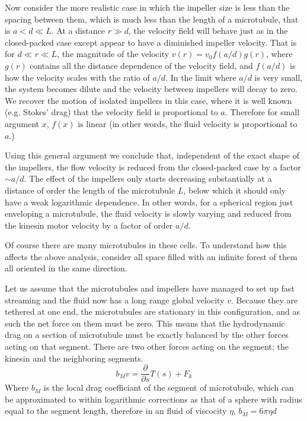 \documentclass[11pt]{ucthesis}
\begin{document}
Now consider the more realistic case in which the impeller size is less than
the spacing between them, which is much less than the length of a
microtubule, that is $a < d \ll L$.  At a distance $r \gg d$, the
velocity field will behave just as in the closed-packed case except appear
to have a diminished impeller velocity. That is for $d \ll r \ll L$,
the magnitude of the velocity $v(r)  = v_0 f(a/d) g(r)$, where $g(r)$
contains all the distance dependence of the velocity field, and $f(a/d)$
is how the velocity scales with the ratio of $a/d$. In the limit where
$a/d$ is very small, the system becomes dilute and the velocity between 
impellers will decay to zero. We recover the motion of isolated impellers
in this case, where it is well known (e.g. Stokes' drag) that the velocity
field is proportional to $a$. Therefore for small argument $x$, $f(x)$ is
linear (in other words, the fluid velocity is proportional to $a$.) 

Using this general argument we conclude that, independent of the exact shape of the impellers,
the flow velocity is reduced from the closed-packed case by a factor $\sim a/d$. The effect
of the impellers only starts decreasing substantially at a distance of order the
length of the microtubule $L$, below which it should only have a weak logarithmic
dependence. In other words, for a spherical region just enveloping a microtubule,
the fluid velocity is slowly varying and reduced from the kinesin motor velocity 
by a factor of order $a/d$.


Of course there are  many microtubules in these cells. To understand how this
affects the above analysis, consider all space filled with an infinite forest of them all oriented
in the same direction. 

Let us assume that the microtubules and impellers have managed to set up fast streaming and the fluid now has a long range global velocity $v$.
Because they are tethered at one end, the microtubules are stationary in this configuration, and as such the net force on them must be zero. 
This means that the hydrodynamic drag on a section of microtubule must be exactly balanced by the other forces acting on that segment.
There are two other forces acting on the segment; the kinesin and the neighboring segments.
\begin{equation}
\label{eq:mfnetMforce}
b_M v = \frac{\partial}{\partial s}T(s) + F_k
\end{equation}
Where $b_M$ is the local drag coefficiant of the segment of microtubule, which can be approximated to within logarithmic corrections as that of a sphere with radius equal to the segment length, therefore in an fluid of viscocity $\eta$, $b_M = 6\pi \eta d$
\end{document}
